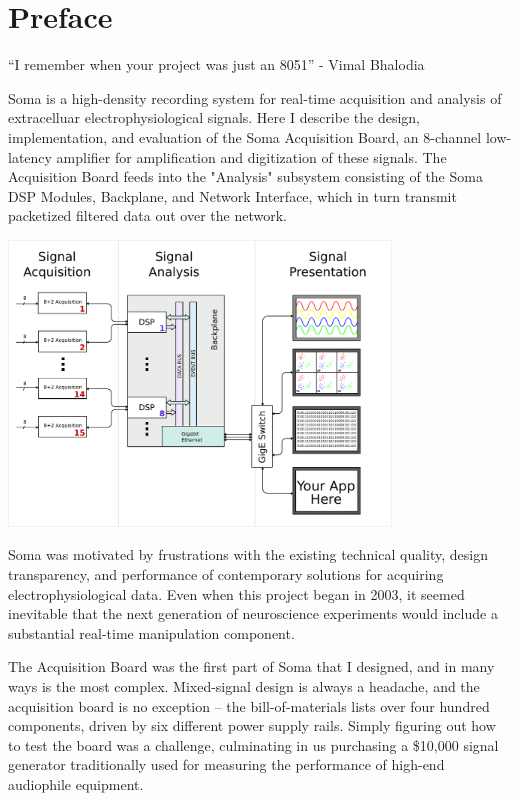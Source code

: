 \chapter*{Preface}

\begin{flushright}
``I remember when your project was just an 8051'' - Vimal Bhalodia
\end{flushright}

\vspace{0.8in}

Soma is a high-density recording system for real-time acquisition and
analysis of extracelluar electrophysiological signals. Here I describe
the design, implementation, and evaluation of the Soma Acquisition Board, 
an 8-channel low-latency amplifier for amplification and digitization
of these signals. The Acquisition Board feeds into the "Analysis" subsystem
consisting of the Soma DSP Modules, Backplane, and Network Interface,
which in turn transmit packetized filtered data out over the network. 

\begin{center}
\includegraphics[width=4in]{arch.pdf}
\end{center}

Soma was motivated by frustrations with the existing technical
quality, design transparency, and performance of contemporary
solutions for acquiring electrophysiological data. Even when this
project began in 2003, it seemed inevitable that the next generation
of neuroscience experiments would include a substantial real-time
manipulation component.

The Acquisition Board was the first part of Soma that I designed, and
in many ways is the most complex. Mixed-signal design is always a
headache, and the acquisition board is no exception -- the
bill-of-materials lists over four hundred components, driven by six
different power supply rails.  Simply figuring out how to test the
board was a challenge, culminating in us purchasing a \$10,000 signal
generator traditionally used for measuring the performance of high-end
audiophile equipment.

